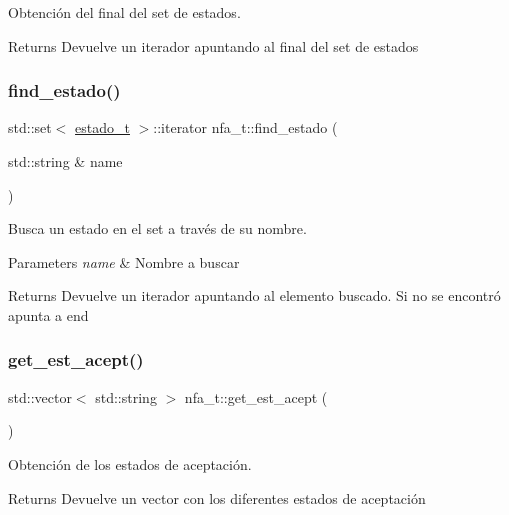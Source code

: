 Obtención del final del set de estados. 

\begin{DoxyReturn}{Returns}
Devuelve un iterador apuntando al final del set de estados 
\end{DoxyReturn}
\mbox{\label{classnfa__t_a3aec6eceda15056b3099396e9807a515}} 
\subsubsection{\texorpdfstring{find\+\_\+estado()}{find\_estado()}}
{\footnotesize\ttfamily std\+::set$<$ \hyperlink{classestado__t}{estado\+\_\+t} $>$\+::iterator nfa\+\_\+t\+::find\+\_\+estado (\begin{DoxyParamCaption}\item[{std\+::string \&}]{name }\end{DoxyParamCaption})}



Busca un estado en el set a través de su nombre. 


\begin{DoxyParams}{Parameters}
{\em name} & Nombre a buscar \\
\hline
\end{DoxyParams}
\begin{DoxyReturn}{Returns}
Devuelve un iterador apuntando al elemento buscado. Si no se encontró apunta a end 
\end{DoxyReturn}
\mbox{\label{classnfa__t_af79e10ba315f1a07af4193e242d3eac1}} 
\subsubsection{\texorpdfstring{get\+\_\+est\+\_\+acept()}{get\_est\_acept()}}
{\footnotesize\ttfamily std\+::vector$<$ std\+::string $>$ nfa\+\_\+t\+::get\+\_\+est\+\_\+acept (\begin{DoxyParamCaption}{ }\end{DoxyParamCaption})}



Obtención de los estados de aceptación. 

\begin{DoxyReturn}{Returns}
Devuelve un vector con los diferentes estados de aceptación 
\end{DoxyReturn}
\mbox{\label{classnfa__t_a37c1254862fdce74c2a1ff879f9d78a6}} 
